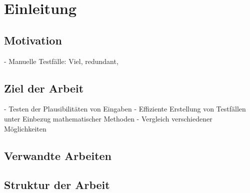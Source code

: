 \chapter{Einleitung}\label{chap:einleitung}

\section{Motivation}\label{sec:motivation}

- Manuelle Testfälle: Viel, redundant, 

\section{Ziel der Arbeit}\label{sec:zielderArbeit}

- Testen der Plausibilitäten von Eingaben
- Effiziente Erstellung von Testfällen unter Einbezug mathematischer Methoden
- Vergleich verschiedener Möglichkeiten

\section{Verwandte Arbeiten}\label{sec:verwandteArbeiten}

\section{Struktur der Arbeit}\label{sec:strukturderArbeit}
